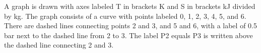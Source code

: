 A graph is drawn with axes labeled T in brackets K and S in brackets kJ divided by kg. The graph consists of a curve with points labeled 0, 1, 2, 3, 4, 5, and 6. There are dashed lines connecting points 2 and 3, and 5 and 6, with a label of 0.5 bar next to the dashed line from 2 to 3. The label P2 equals P3 is written above the dashed line connecting 2 and 3.